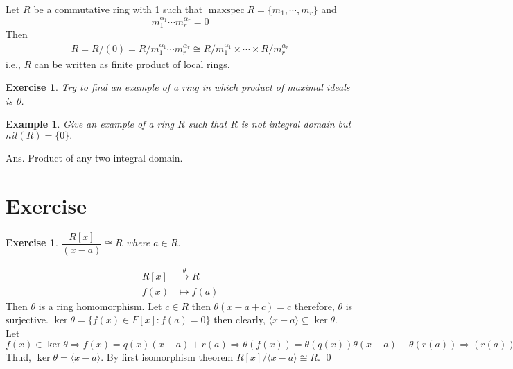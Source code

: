 \documentclass[11pt]{amsart}
\newtheorem{ex}[theorem]{Exercise}
\newtheorem{eg}[theorem]{Example}
\newcommand{\gen}[1]{\langle#1\rangle}
\DeclareMathOperator{\mspec}{\text{maxspec}}
\begin{document}
 Let $R$ be a commutative ring with 1 such that $\mspec R=\{m_1,\cdots,m_r\}$ and $$m_1^{\alpha_1}\cdots m_r^{\alpha_r}=0$$ Then \begin{align*}
 R=R/(0)=R/m_1^{\alpha_1}\cdots m_r^{\alpha_r}\cong R/m_1^{\alpha_1}\times \cdots \times R/m_r^{\alpha_r}
 \end{align*}
i.e., $R$ can be written as finite product of local rings. 
\begin{ex}
Try to find an example of a ring in which product of maximal ideals is 0.
\end{ex}
\begin{eg}
Give an example of a ring $R$ such that $R$ is not integral domain but $nil (R)=\{0\}.$ 
\end{eg}
Ans. Product of any two integral domain.

































\newpage
\section{Exercise}
\begin{ex}
$\dfrac{R[x]}{(x-a)}\cong R$ where $a\in R.$
\end{ex}
\proof \begin{align*}
R[x]&\stackrel{\theta}{\longrightarrow} R\\
f(x)&\mapsto f(a)
\end{align*}
Then $\theta$ is a ring homomorphism. Let $c\in R$ then $ \theta(x-a+c)=c$ therefore, $\theta$ is surjective. $\ker \theta=\{f(x)\in F[x]:f(a)=0\}$ then clearly, $\gen{x-a}\subseteq \ker \theta.$ Let $f(x)\in \ker \theta \Rightarrow f(x)=q(x)(x-a)+r(a) \Rightarrow \theta(f(x))=\theta(q(x))\theta(x-a)+\theta(r(a)) \Rightarrow (r(a))=0 \Rightarrow \ker \theta \subseteq \gen{x-a}.$ Thud, $\ker \theta=\gen{x-a}.$ By first isomorphism theorem $R[x]/\gen{x-a}\cong R.$ \qed
\end{document}
